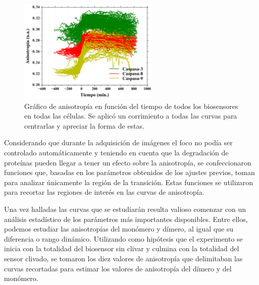 \begin{figure}
    \centering
    \includegraphics[width=0.6\textwidth]{./img/Cap4/AnisoJuntas.png}
    \caption{Gráfico de anisotropía en función del tiempo de todos los biosensores en todas las células. Se aplicó un corrimiento a todas las curvas para centrarlas y apreciar la forma de estas.}
    \label{fig:todas}
\end{figure}

Considerando que durante la adquisición de imágenes el foco no podía ser controlado automáticamente y teniendo en cuenta que la degradación de proteínas pueden llegar a tener un efecto sobre la anisotropía, se confeccionaron funciones que, basadas en los parámetros obtenidos de los ajustes previos, toman para analizar únicamente la región de la transición. Estas funciones se utilizaron para recortar las regiones de interés en las curvas de anisotropía.

Una vez halladas las curvas que se estudiarán resulta valioso comenzar con un análisis estadístico de los parámetros más importantes disponibles. Entre ellos, podemos estudiar las anisotropías del monómero y dímero, al igual que su diferencia o rango dinámico. Utilizando como hipótesis que el experimento se inicia con la totalidad del biosensor sin clivar y culmina con la totalidad del sensor clivado, se tomaron los diez valores de anisotropía que delimitaban las curvas recortadas para estimar los valores de anisotropía del dímero y del monómero.


